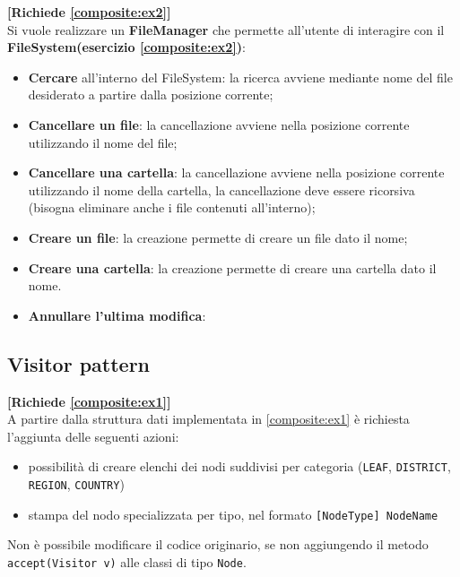 \documentclass[12pt,a4paper]{article}
\begin{document}
    \begin{Exercise}[label=command:ex3]
    \small\textbf{[Richiede \hyperlink{composite:ex2}{\ref{composite:ex2}}]} \\
    Si vuole realizzare un \textbf{FileManager} che permette all'utente di interagire con il \textbf{FileSystem(esercizio \hyperlink{composite:ex2}{\ref{composite:ex2}})}:
        \begin{itemize}
            \item \textbf{Cercare} all'interno del FileSystem: la ricerca avviene mediante nome del file desiderato a partire dalla posizione corrente;
            \item \textbf{Cancellare un file}: la cancellazione avviene nella posizione corrente utilizzando il nome del file;
            \item \textbf{Cancellare una cartella}: la cancellazione avviene nella posizione corrente utilizzando il nome della cartella, la cancellazione deve essere ricorsiva (bisogna eliminare anche i file contenuti all'interno);
            \item \textbf{Creare un file}: la creazione permette di creare un file dato il nome;
            \item \textbf{Creare una cartella}: la creazione permette di creare una cartella dato il nome.
            \item \textbf{Annullare l'ultima modifica}: 
        \end{itemize}
        
    \end{Exercise}
    
    
    
    \subsection{Visitor pattern}\label{pattern:visitors}
    \begin{Exercise}
    \small\textbf{[Richiede \hyperlink{composite:ex1}{\ref{composite:ex1}}]} \\
    A partire dalla struttura dati implementata in \hyperlink{composite:ex1}{\ref{composite:ex1}} è richiesta l'aggiunta delle seguenti azioni:
    \begin{itemize}
        \item possibilità di creare elenchi dei nodi suddivisi per categoria (\texttt{LEAF}, \texttt{DISTRICT}, \texttt{REGION}, \texttt{COUNTRY})
        \item stampa del nodo specializzata per tipo, nel formato \texttt{[NodeType] NodeName}
    \end{itemize}
    Non è possibile modificare il codice originario, se non aggiungendo il metodo \texttt{accept(Visitor v)} alle classi di tipo \texttt{Node}.
    \end{Exercise}    
    
\end{document}
